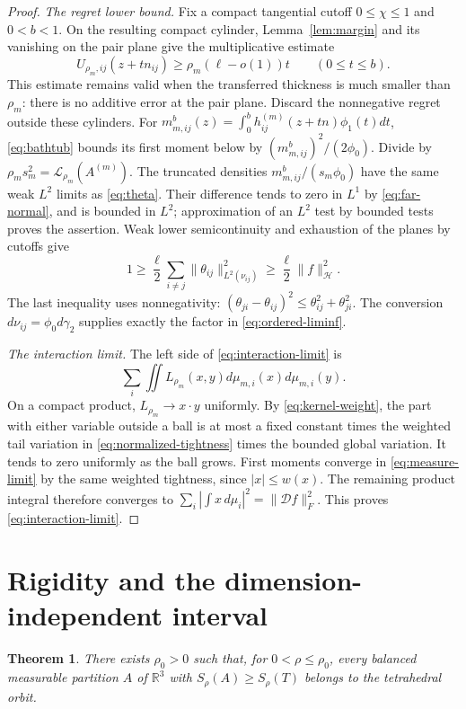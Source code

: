 \documentclass[11pt,reqno]{amsart}
\newtheorem{theorem}{Theorem}[section]
\theoremstyle{remark}
\newcommand{\R}{\mathbb R}
\newcommand{\norm}[1]{\lVert #1\rVert}
\newcommand{\ga}{\gamma}
\newcommand{\LL}{\mathcal L}
\newcommand{\HH}{\mathcal H}
\newcommand{\DD}{\mathcal D}
\begin{document}
\begin{proof}
\smallskip\noindent\emph{The regret lower bound.}
Fix a compact tangential cutoff $0\le\chi\le1$ and $0<b<1$.
On the resulting compact cylinder, Lemma~\ref{lem:margin} and its
vanishing on the pair plane give the multiplicative estimate
\[
 U_{\rho_m,ij}(z+tn_{ij})
 \ge\rho_m(\ell-o(1))t\qquad(0\le t\le b).
\]
This estimate remains valid when the transferred thickness is much
smaller than $\rho_m$: there is no additive error at the pair plane.
Discard the nonnegative regret outside these cylinders.
For $m_{m,ij}^b(z)=\int_0^b h_{ij}^{(m)}(z+tn)\phi_1(t)dt$,
\eqref{eq:bathtub} bounds its first moment below by
$(m_{m,ij}^b)^2/(2\phi_0)$.
Divide by $\rho_ms_m^2=\LL_{\rho_m}(A^{(m)})$.
The truncated densities $m_{m,ij}^b/(s_m\phi_0)$ have the same weak
$L^2$ limits as \eqref{eq:theta}. Their difference tends to zero in
$L^1$ by \eqref{eq:far-normal}, and is bounded in $L^2$; approximation
of an $L^2$ test by bounded tests proves the assertion.
Weak lower semicontinuity and exhaustion of the planes by cutoffs give
\begin{equation}\label{eq:ordered-liminf}
 1\ge\frac\ell2\sum_{i\ne j}\norm{\theta_{ij}}_{L^2(\nu_{ij})}^2
 \ge\frac\ell2\norm{f}_{\HH}^2.
\end{equation}
The last inequality uses nonnegativity:
$(\theta_{ji}-\theta_{ij})^2\le\theta_{ij}^2+\theta_{ji}^2$.
The conversion $d\nu_{ij}=\phi_0d\ga_2$ supplies exactly the factor
in \eqref{eq:ordered-liminf}.

\smallskip\noindent\emph{The interaction limit.}
The left side of \eqref{eq:interaction-limit} is
\[
 \sum_i\iint L_{\rho_m}(x,y)d\mu_{m,i}(x)d\mu_{m,i}(y).
\]
On a compact product, $L_{\rho_m}\to x\cdot y$ uniformly.
By \eqref{eq:kernel-weight}, the part with either variable outside a
ball is at most a fixed constant times the weighted tail variation in
\eqref{eq:normalized-tightness} times the bounded global variation.
It tends to zero uniformly as the ball grows.
First moments converge in \eqref{eq:measure-limit} by the same weighted
tightness, since $|x|\le w(x)$. The remaining product integral therefore
converges to $\sum_i|\int x\,d\mu_i|^2=\norm{\DD f}_F^2$.
This proves \eqref{eq:interaction-limit}.
\end{proof}

\section{Rigidity and the dimension-independent interval}

\begin{theorem}\label{thm:rigidity}
There exists $\rho_0>0$ such that, for $0<\rho\le\rho_0$, every
balanced measurable partition $A$ of $\R^3$ with
$S_\rho(A)\ge S_\rho(T)$ belongs to the tetrahedral orbit.
\end{theorem}
\end{document}
